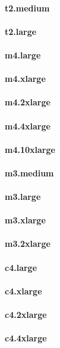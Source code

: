 \documentclass{acm_proc_article-sp}
\begin{document}
\paragraph{t2.medium}
\paragraph{t2.large}
\paragraph{m4.large}
\paragraph{m4.xlarge}
\paragraph{m4.2xlarge}
\paragraph{m4.4xlarge}
\paragraph{m4.10xlarge}
\paragraph{m3.medium}
\paragraph{m3.large}
\paragraph{m3.xlarge}
\paragraph{m3.2xlarge}
\paragraph{c4.large}
\paragraph{c4.xlarge}
\paragraph{c4.2xlarge}
\paragraph{c4.4xlarge}
\end{document}
